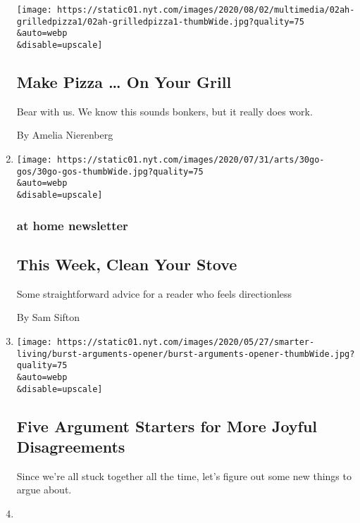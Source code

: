 \begin{enumerate}
  \texttt{[image: https://static01.nyt.com/images/2020/08/02/multimedia/02ah-grilledpizza1/02ah-grilledpizza1-thumbWide.jpg?quality=75\\\&auto=webp\\\&disable=upscale]}

  \hypertarget{make-pizza--on-your-grill}{%
  \subsection{Make Pizza \ldots{} On Your
  Grill}\label{make-pizza--on-your-grill}}

  Bear with us. We know this sounds bonkers, but it really does work.

  By Amelia Nierenberg
\item
  \href{/2020/07/31/at-home/newsletter.html}{}

  \texttt{[image: https://static01.nyt.com/images/2020/07/31/arts/30go-gos/30go-gos-thumbWide.jpg?quality=75\\\&auto=webp\\\&disable=upscale]}

  \hypertarget{at-home-newsletter}{%
  \subsubsection{at home newsletter}\label{at-home-newsletter}}

  \hypertarget{this-week-clean-your-stove}{%
  \subsection{This Week, Clean Your
  Stove}\label{this-week-clean-your-stove}}

  Some straightforward advice for a reader who feels directionless

  By Sam Sifton
\item
  \href{/interactive/2020/07/31/smarter-living/argument-starters.html}{}

  \texttt{[image: https://static01.nyt.com/images/2020/05/27/smarter-living/burst-arguments-opener/burst-arguments-opener-thumbWide.jpg?quality=75\\\&auto=webp\\\&disable=upscale]}

  \hypertarget{five-argument-starters-for-more-joyful-disagreements}{%
  \subsection{Five Argument Starters for More Joyful
  Disagreements}\label{five-argument-starters-for-more-joyful-disagreements}}

  Since we're all stuck together all the time, let's figure out some new
  things to argue about.
\item
  \href{/2020/07/30/style/masks-in-public-coronavirus.html}{}


\end{enumerate}
